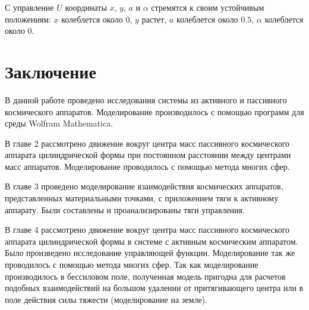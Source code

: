 С управление $U$ координаты $x$, $y$, $a$ и $\alpha$ стремятся к своим устойчивым положениям: $x$ колеблется около 0, $y$ растет,  $a$ колеблется около $0.5$, $\alpha$ колеблется около 0.



\section*{Заключение}

В данной работе проведено исследования системы из активного и пассивного космического аппаратов. Моделирование производилось с помощью программ для среды Wolfram Mathematica.

В главе 2 рассмотрено движение вокруг центра масс пассивного космического аппарата цилиндрической формы при постоянном расстоянии между центрами масс аппаратов. Моделирование проводилось с помощью метода многих сфер.

В главе 3 проведено моделирование взаимодействия космических аппаратов, представленных материальными точками, с приложением тяги к активному аппарату. Были составлены и проанализированы тяги управления.

В главе 4 рассмотрено движение вокруг центра масс пассивного космического аппарата цилиндрической формы в системе с активным космическим аппаратом. Было произведено исследование управляющей функции. Моделирование так же проводилось с помощью метода многих сфер. Так как моделирование производилось в бессиловом поле, полученная модель пригодна для расчетов подобных взаимодействий на большом удалении от притягивающего центра или в поле действия силы тяжести (моделирование на земле).